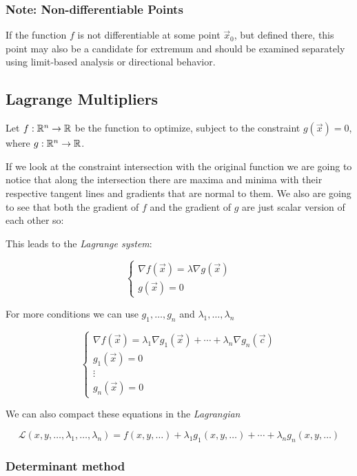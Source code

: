 \subsubsection{Note: Non-differentiable Points}

If the function \( f \) is not differentiable at some point \( \vec{x}_0 \), but defined there, this point may also be a 
candidate for extremum and should be examined separately using limit-based analysis or directional behavior.

\subsection{Lagrange Multipliers}

Let \( f : \mathbb{R}^n \to \mathbb{R} \) be the function to optimize, subject to the constraint \( g(\vec{x}) = 0 \), where \( g : \mathbb{R}^n \to \mathbb{R} \).  

If we look at the constraint intersection with the original function we are going to notice that along the intersection
there are maxima and minima with their respective tangent lines
and gradients that are normal to them. We also are going to see that both the gradient of \(f\) and 
the gradient of \(g\) are just scalar version of each other so: 

This leads to the \emph{Lagrange system}:

\[
    \begin{cases}
    \nabla f(\vec{x}) = \lambda \nabla g(\vec{x}) \\
    g(\vec{x}) = 0
    \end{cases}
\]

For more conditions  we can use \(g_1, \dots, g_n\) and \(\lambda_1, \dots, \lambda_n\)

\[
    \begin{cases}
    \nabla f(\vec{x}) = \lambda_1 \nabla g_1(\vec{x}) + \cdots + \lambda_n \nabla g_n(\vec{c}) \\
    g_1(\vec{x}) = 0 \\
    \vdots \\
    g_n(\vec{x}) = 0
    \end{cases}
\]

We can also compact these equations in the \emph{Lagrangian}

\[
    \mathcal{L}(x,y, \dots, \lambda_1, \dots, \lambda_n) = f(x, y, \dots) + \lambda_1 g_1(x, y, \dots) + \cdots + \lambda_n g_n(x, y, \dots)
\]

\subsubsection{Determinant method}

